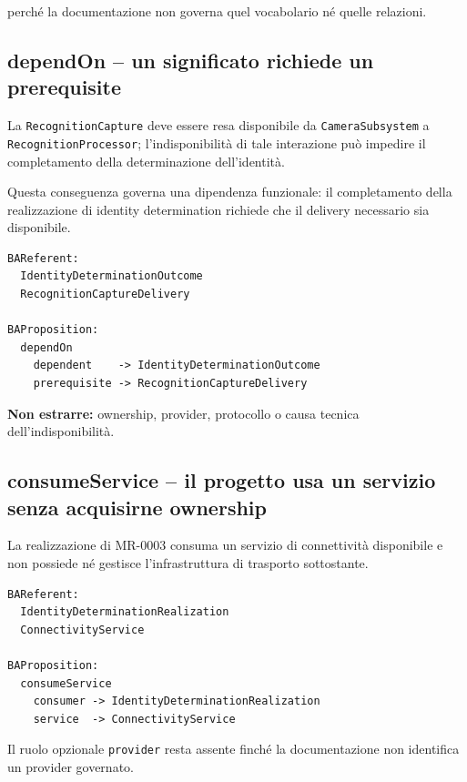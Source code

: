\documentclass[11pt,a4paper]{article}
\newcommand{\code}[1]{\nolinkurl{#1}}
\begin{document}
perché la documentazione non governa quel vocabolario né quelle relazioni.

\subsection{dependOn -- un significato richiede un prerequisite}

\begin{examplebox}
La \code{RecognitionCapture} deve essere resa disponibile da \code{CameraSubsystem} a \code{RecognitionProcessor}; l'indisponibilità di tale interazione può impedire il completamento della determinazione dell'identità.
\end{examplebox}

Questa conseguenza governa una dipendenza funzionale: il completamento della realizzazione di identity determination richiede che il delivery necessario sia disponibile.

\begin{lstlisting}
BAReferent:
  IdentityDeterminationOutcome
  RecognitionCaptureDelivery

BAProposition:
  dependOn
    dependent    -> IdentityDeterminationOutcome
    prerequisite -> RecognitionCaptureDelivery
\end{lstlisting}

\textbf{Non estrarre:} ownership, provider, protocollo o causa tecnica dell'indisponibilità.

\subsection{consumeService -- il progetto usa un servizio senza acquisirne ownership}

\begin{examplebox}
La realizzazione di MR-0003 consuma un servizio di connettività disponibile e non possiede né gestisce l'infrastruttura di trasporto sottostante.
\end{examplebox}

\begin{lstlisting}
BAReferent:
  IdentityDeterminationRealization
  ConnectivityService

BAProposition:
  consumeService
    consumer -> IdentityDeterminationRealization
    service  -> ConnectivityService
\end{lstlisting}

Il ruolo opzionale \code{provider} resta assente finché la documentazione non identifica un provider governato.
\end{document}
